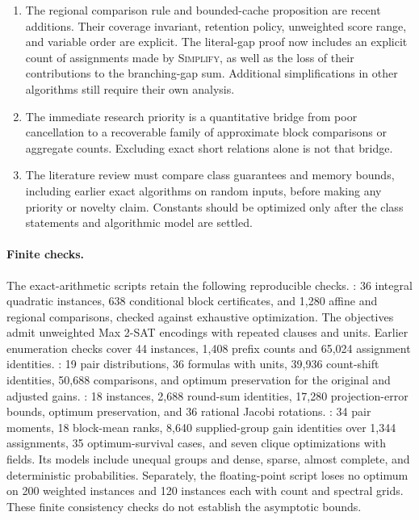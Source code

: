 \documentclass[11pt,a4paper]{article}
\theoremstyle{definition}
\theoremstyle{remark}
\begin{document}
\begin{enumerate}
 in an appendix. Its stronger unit-clause
adversary and vanishing sampling probabilities distinguish it from the
arbitrary-support weighted corollary. The previously sharper almost-regular
constant is retained separately in Appendix~\ref{app:regular}.
\item The regional comparison rule and bounded-cache proposition are recent
additions. Their coverage invariant, retention policy, unweighted score
range, and variable order are explicit. The literal-gap proof now includes
an explicit count of assignments made by \textnormal{\textsc{Simplify}}, as well as the
loss of their contributions to the branching-gap sum. Additional
simplifications in other algorithms still require their own analysis.
\item The immediate research priority is a quantitative bridge from poor
cancellation to a recoverable family of approximate block comparisons or
aggregate counts. Excluding exact short relations alone is not that bridge.
\item The literature review must compare class guarantees and memory bounds,
including earlier exact algorithms on random inputs, before making any
priority or novelty claim. Constants should be optimized only after the
class statements and algorithmic model are settled.
\end{enumerate}

\paragraph{Finite checks.}
The exact-arithmetic scripts retain the following reproducible checks.
: 36 integral quadratic instances,
638 conditional block certificates, and 1,280 affine and regional
comparisons, checked against exhaustive optimization. The objectives
admit unweighted Max 2-SAT encodings with repeated clauses and units.
Earlier enumeration checks cover 44 instances, 1,408 prefix counts and
65,024 assignment identities.
: 19 pair distributions,
36 formulas with units, 39,936 count-shift identities, 50,688 comparisons,
and optimum preservation for the original and adjusted gains.
: 18 instances, 2,688 round-sum
identities, 17,280 projection-error bounds, optimum preservation, and
36 rational Jacobi rotations.
: 34 pair moments, 18 block-mean ranks,
8,640 supplied-group gain identities over 1,344 assignments,
35 optimum-survival cases, and seven clique optimizations with fields.
Its models include unequal groups and dense, sparse, almost complete,
and deterministic probabilities. Separately, the floating-point script
 loses no optimum on 200 weighted
instances and 120 instances each with count and spectral grids.
These finite consistency checks do not establish the asymptotic bounds.
\end{document}
